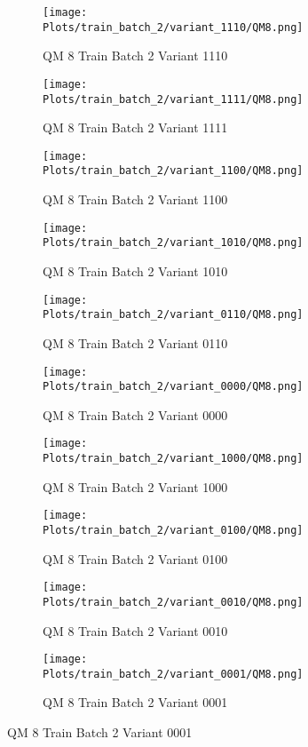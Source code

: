 \documentclass{DissertateFigs}
\begin{document}
\begin{figure}[t!]
    \begin{subfigure}{0.38\textwidth}
    \texttt{[image: Plots/train\_batch\_2/variant\_1110/QM8.png]}
    \caption{QM 8 Train Batch 2 Variant 1110}
    \end{subfigure}
    \begin{subfigure}{0.38\textwidth}
    \texttt{[image: Plots/train\_batch\_2/variant\_1111/QM8.png]}
    \caption{QM 8 Train Batch 2 Variant 1111}
    \end{subfigure}

\medskip

    \begin{subfigure}{0.38\textwidth}
    \texttt{[image: Plots/train\_batch\_2/variant\_1100/QM8.png]}
    \caption{QM 8 Train Batch 2 Variant 1100}
    \end{subfigure}
    \begin{subfigure}{0.38\textwidth}
    \texttt{[image: Plots/train\_batch\_2/variant\_1010/QM8.png]}
    \caption{QM 8 Train Batch 2 Variant 1010}
    \end{subfigure}

\medskip

    \begin{subfigure}{0.38\textwidth}
    \texttt{[image: Plots/train\_batch\_2/variant\_0110/QM8.png]}
    \caption{QM 8 Train Batch 2 Variant 0110}
    \end{subfigure}
    \begin{subfigure}{0.38\textwidth}
    \texttt{[image: Plots/train\_batch\_2/variant\_0000/QM8.png]}
    \caption{QM 8 Train Batch 2 Variant 0000}
    \end{subfigure}

\medskip

    \begin{subfigure}{0.38\textwidth}
    \texttt{[image: Plots/train\_batch\_2/variant\_1000/QM8.png]}
    \caption{QM 8 Train Batch 2 Variant 1000}
    \end{subfigure}
    \begin{subfigure}{0.38\textwidth}
    \texttt{[image: Plots/train\_batch\_2/variant\_0100/QM8.png]}
    \caption{QM 8 Train Batch 2 Variant 0100}
    \end{subfigure}

\medskip

    \begin{subfigure}{0.38\textwidth}
    \texttt{[image: Plots/train\_batch\_2/variant\_0010/QM8.png]}
    \caption{QM 8 Train Batch 2 Variant 0010}
    \end{subfigure}
    \begin{subfigure}{0.38\textwidth}
    \texttt{[image: Plots/train\_batch\_2/variant\_0001/QM8.png]}
    \caption{QM 8 Train Batch 2 Variant 0001}
    \end{subfigure}


\end{figure}
\end{document}
